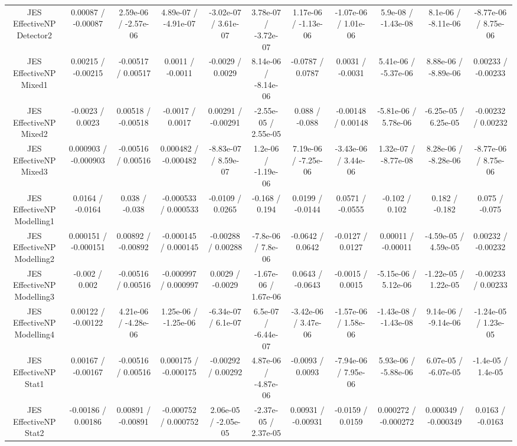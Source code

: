 \begin{table}[htbp]
\begin{center}
\begin{tabular}{|c|c|c|c|c|c|c|c|c|c|c|}
  JES EffectiveNP Detector2 & 0.00087 / -0.00087 & 2.59e-06 / -2.57e-06 & 4.89e-07 / -4.91e-07 & -3.02e-07 / 3.61e-07 & 3.78e-07 / -3.72e-07 & 1.17e-06 / -1.13e-06 & -1.07e-06 / 1.01e-06 & 5.9e-08 / -1.43e-08 & 8.1e-06 / -8.11e-06 & -8.77e-06 / 8.75e-06 \\ 
  JES EffectiveNP Mixed1 & 0.00215 / -0.00215 & -0.00517 / 0.00517 & 0.0011 / -0.0011 & -0.0029 / 0.0029 & 8.14e-06 / -8.14e-06 & -0.0787 / 0.0787 & 0.0031 / -0.0031 & 5.41e-06 / -5.37e-06 & 8.88e-06 / -8.89e-06 & 0.00233 / -0.00233 \\ 
  JES EffectiveNP Mixed2 & -0.0023 / 0.0023 & 0.00518 / -0.00518 & -0.0017 / 0.0017 & 0.00291 / -0.00291 & -2.55e-05 / 2.55e-05 & 0.088 / -0.088 & -0.00148 / 0.00148 & -5.81e-06 / 5.78e-06 & -6.25e-05 / 6.25e-05 & -0.00232 / 0.00232 \\ 
  JES EffectiveNP Mixed3 & 0.000903 / -0.000903 & -0.00516 / 0.00516 & 0.000482 / -0.000482 & -8.83e-07 / 8.59e-07 & 1.2e-06 / -1.19e-06 & 7.19e-06 / -7.25e-06 & -3.43e-06 / 3.44e-06 & 1.32e-07 / -8.77e-08 & 8.28e-06 / -8.28e-06 & -8.77e-06 / 8.75e-06 \\ 
  JES EffectiveNP Modelling1 & 0.0164 / -0.0164 & 0.038 / -0.038 & -0.000533 / 0.000533 & -0.0109 / 0.0265 & -0.168 / 0.194 & 0.0199 / -0.0144 & 0.0571 / -0.0555 & -0.102 / 0.102 & 0.182 / -0.182 & 0.075 / -0.075 \\ 
  JES EffectiveNP Modelling2 & 0.000151 / -0.000151 & 0.00892 / -0.00892 & -0.000145 / 0.000145 & -0.00288 / 0.00288 & -7.8e-06 / 7.8e-06 & -0.0642 / 0.0642 & -0.0127 / 0.0127 & 0.00011 / -0.00011 & -4.59e-05 / 4.59e-05 & 0.00232 / -0.00232 \\ 
  JES EffectiveNP Modelling3 & -0.002 / 0.002 & -0.00516 / 0.00516 & -0.000997 / 0.000997 & 0.0029 / -0.0029 & -1.67e-06 / 1.67e-06 & 0.0643 / -0.0643 & -0.0015 / 0.0015 & -5.15e-06 / 5.12e-06 & -1.22e-05 / 1.22e-05 & -0.00233 / 0.00233 \\ 
  JES EffectiveNP Modelling4 & 0.00122 / -0.00122 & 4.21e-06 / -4.28e-06 & 1.25e-06 / -1.25e-06 & -6.34e-07 / 6.1e-07 & 6.5e-07 / -6.44e-07 & -3.42e-06 / 3.47e-06 & -1.57e-06 / 1.58e-06 & -1.43e-08 / -1.43e-08 & 9.14e-06 / -9.14e-06 & -1.24e-05 / 1.23e-05 \\ 
  JES EffectiveNP Stat1 & 0.00167 / -0.00167 & -0.00516 / 0.00516 & 0.000175 / -0.000175 & -0.00292 / 0.00292 & 4.87e-06 / -4.87e-06 & -0.0093 / 0.0093 & -7.94e-06 / 7.95e-06 & 5.93e-06 / -5.88e-06 & 6.07e-05 / -6.07e-05 & -1.4e-05 / 1.4e-05 \\ 
  JES EffectiveNP Stat2 & -0.00186 / 0.00186 & 0.00891 / -0.00891 & -0.000752 / 0.000752 & 2.06e-05 / -2.05e-05 & -2.37e-05 / 2.37e-05 & 0.00931 / -0.00931 & -0.0159 / 0.0159 & 0.000272 / -0.000272 & 0.000349 / -0.000349 & 0.0163 / -0.0163 \\ 

\end{tabular}
\end{center}
\end{table}
